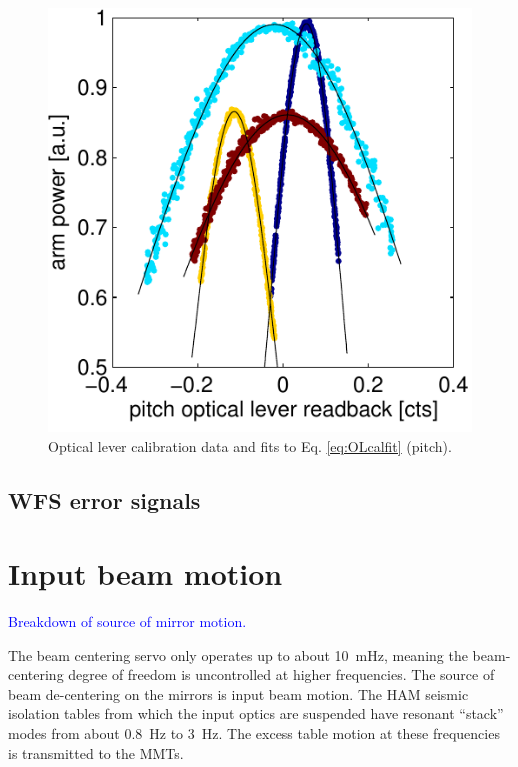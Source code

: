 \begin{figure}
\begin{centering}
\includegraphics[width=1.0\columnwidth]{figures/OLcal_pitch.pdf}
\caption[Optical lever calibration data.]{Optical lever calibration data and
  fits to Eq. \ref{eq:OLcalfit} (pitch).}
\label{fig:OLcalp}
\end{centering}
\end{figure}









\subsection{WFS error signals}



\section{Input beam motion}
\textcolor{blue}{Breakdown of source of mirror motion.}

The beam centering servo only operates up to about 10~mHz, meaning the
beam-centering degree of freedom is uncontrolled at higher
frequencies. The source of beam de-centering on the mirrors is input
beam motion. The HAM seismic isolation tables from which the input
optics are suspended have resonant ``stack'' modes from about 0.8~Hz
to 3~Hz. The excess table motion at these frequencies is transmitted
to the MMTs. 

